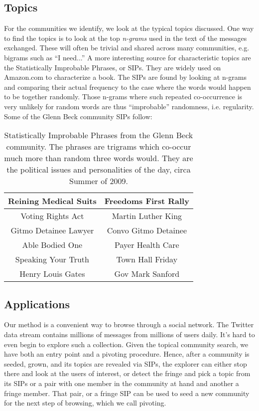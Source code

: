 \subsection{Topics}

For the communities we identify, we look at the typical topics discussed.  One way to find the topics is to look at the top \emph{n-grams} \cite{Ngram:Chen-Goodman} used in the text of the messages exchanged.  These will often be trivial and shared across many communities, e.g. bigrams such as ``I need...''  A more interesting source for characteristic topics are the Statistically Improbable Phrases, or SIPs.  They are widely used on Amazon.com to characterize a book.  The SIPs are found by looking at n-grams and comparing their actual frequency to the case where the words would happen to be together randomly.  Those n-grams where such repeated co-occurrence is very unlikely for random words are thus ``improbable'' randomness, i.e. regularity.  Some of the Glenn Beck community SIPs follow:

\begin{table}
	\centering
\begin{tabular}{|c|c|}
	\hline
	Reining Medical Suits & Freedoms First Rally \\
	\hline
	Voting Rights Act & Martin Luther King \\
	\hline
	Gitmo Detainee Lawyer & Convo Gitmo Detainee \\
	\hline
	Able Bodied One & Payer Health Care \\
	\hline
	Speaking Your Truth & Town Hall Friday \\
	\hline
	Henry Louis Gates & Gov Mark Sanford \\
	\hline 
\end{tabular}
\label{table:gb-sips}
\caption{Statistically Improbable Phrases from the Glenn Beck community.  The phrases are trigrams which co-occur much more than random three words would.  They are the political issues and personalities of the day, circa Summer of 2009.}
\end{table}


\subsection{Applications}

Our method is a convenient way to browse through a social network.  The Twitter data stream contains millions of messages from millions of users daily.  It’s hard to even begin to explore such a collection.  Given the topical community search, we have both an entry point and a pivoting procedure.  Hence, after a community is seeded, grown, and its topics are revealed via SIPs, the explorer can either stop there and look at the users of interest, or detect the fringe and pick a topic from its SIPs or a pair with one member in the community at hand and another a fringe member.  That pair, or a fringe SIP can be used to seed a new community for the next step of browsing, which we call pivoting.
